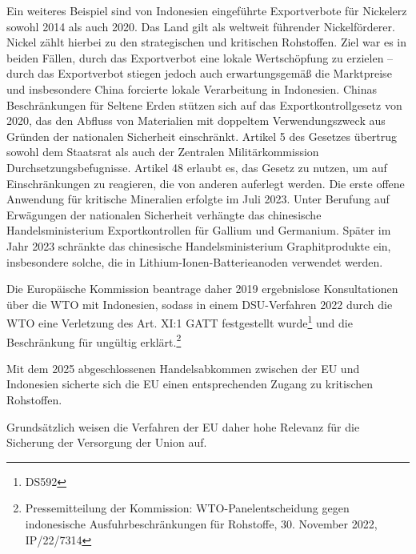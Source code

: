 \documentclass[12pt,a4paper,oneside]{book} %
\begin{document}
Ein weiteres Beispiel sind von Indonesien eingeführte Exportverbote für Nickelerz sowohl 2014 als auch 2020. Das Land gilt als weltweit führender Nickelförderer.\autocite[52]{DERA Rohstoffinformation Indonesien, } Nickel zählt hierbei zu den strategischen und kritischen Rohstoffen. Ziel war es in beiden Fällen, durch das Exportverbot eine lokale Wertschöpfung zu erzielen -- durch das Exportverbot stiegen jedoch auch erwartungsgemäß die Marktpreise und insbesondere China forcierte lokale Verarbeitung in Indonesien.\autocite{DERA} Chinas Beschränkungen für Seltene Erden stützen sich auf das Exportkontrollgesetz von 2020, das den Abfluss von Materialien mit doppeltem Verwendungszweck aus Gründen der nationalen Sicherheit einschränkt. Artikel 5 des Gesetzes übertrug sowohl dem Staatsrat als auch der Zentralen Militärkommission Durchsetzungsbefugnisse. Artikel 48 erlaubt es, das Gesetz zu nutzen, um auf Einschränkungen zu reagieren, die von anderen auferlegt werden. Die erste offene Anwendung für kritische Mineralien erfolgte im Juli 2023. Unter Berufung auf Erwägungen der nationalen Sicherheit verhängte das chinesische Handelsministerium Exportkontrollen für Gallium und Germanium. Später im Jahr 2023 schränkte das chinesische Handelsministerium Graphitprodukte ein, insbesondere solche, die in Lithium-Ionen-Batterieanoden verwendet werden. 

Die Europäische Kommission beantrage daher 2019 ergebnislose Konsultationen über die WTO mit Indonesien, sodass in einem DSU-Verfahren 2022 durch die WTO eine Verletzung des Art. XI:1 GATT festgestellt wurde\footnote{DS592} und die Beschränkung für ungültig erklärt.\footnote{Pressemitteilung der Kommission: WTO-Panelentscheidung gegen indonesische Ausfuhrbeschränkungen für Rohstoffe, 30. November 2022, IP/22/7314}

Mit dem 2025 abgeschlossenen Handelsabkommen zwischen der EU und Indonesien sicherte sich die EU einen entsprechenden Zugang zu kritischen Rohstoffen.

Grundsätzlich weisen die Verfahren der EU daher hohe Relevanz für die Sicherung der Versorgung der Union auf.
\end{document}
